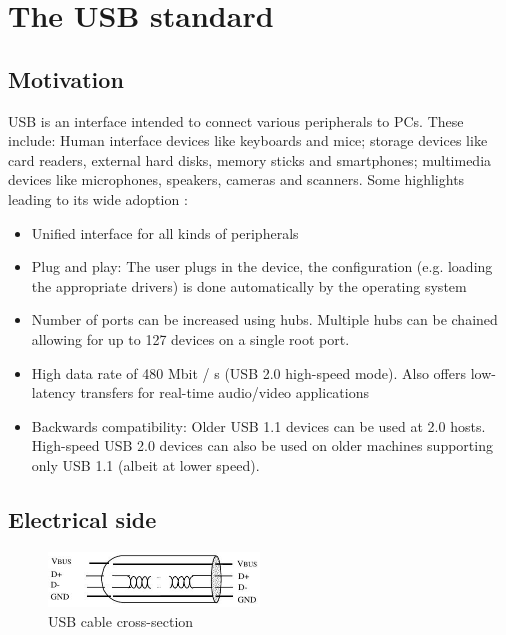 \documentclass{article}
\begin{document}
\section{The USB standard}

\subsection{Motivation}

USB is an interface intended to connect various peripherals to PCs. These include:
Human interface devices like keyboards and mice; storage devices like card readers,
external hard disks, memory sticks and smartphones; multimedia devices like microphones, speakers,
cameras and scanners. Some highlights leading to its wide adoption \cite[p. 11]{usbstd}:

\begin{itemize}
  \item Unified interface for all kinds of peripherals
  \item Plug and play: The user plugs in the device, the configuration (e.g. loading the appropriate drivers)
  is done automatically by the operating system
  \item Number of ports can be increased using hubs. Multiple hubs can be chained
        allowing for up to 127 devices on a single root port.
  \item High data rate of 480 Mbit / s (USB 2.0 high-speed mode). Also offers low-latency
        transfers for real-time audio/video applications
  \item Backwards compatibility: Older USB 1.1 devices can be used at 2.0 hosts.
        High-speed USB 2.0 devices can also be used on older
        machines supporting only USB 1.1 (albeit at lower speed).
\end{itemize}

\subsection{Electrical side}

\begin{figure}[!htbp]
  \caption{USB cable cross-section \cite[p. 17]{usbstd}}
  \centering
  \includegraphics[width=0.5\textwidth]{images/usb_cable.jpg}
\end{figure}
\end{document}

